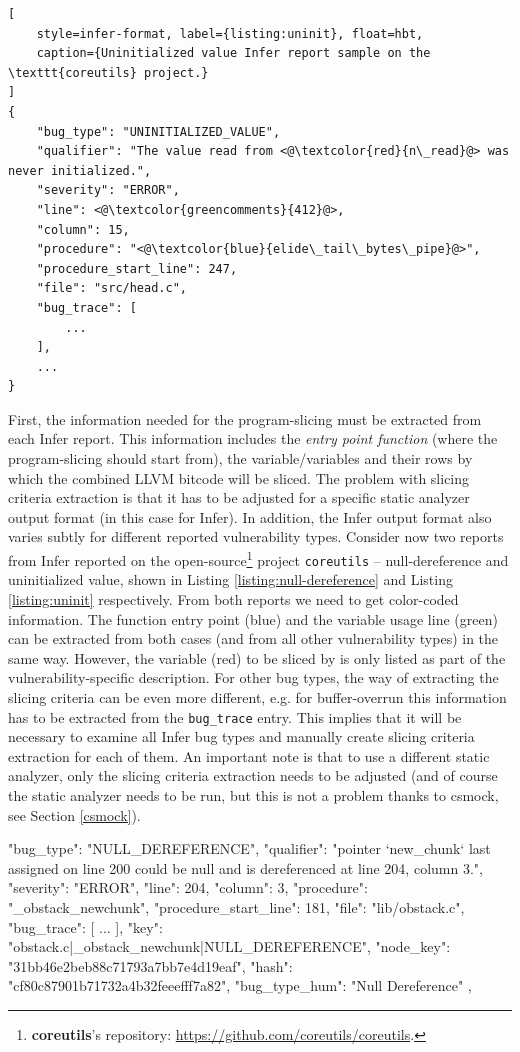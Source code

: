 \begin{lstlisting}[
    style=infer-format, label={listing:uninit}, float=hbt,
    caption={Uninitialized value Infer report sample on the \texttt{coreutils} project.}
]
{
    "bug_type": "UNINITIALIZED_VALUE",
    "qualifier": "The value read from <@\textcolor{red}{n\_read}@> was never initialized.",
    "severity": "ERROR",
    "line": <@\textcolor{greencomments}{412}@>,
    "column": 15,
    "procedure": "<@\textcolor{blue}{elide\_tail\_bytes\_pipe}@>",
    "procedure_start_line": 247,
    "file": "src/head.c",
    "bug_trace": [
        ...
    ],
    ...
}
\end{lstlisting}

First, the information needed for the program-slicing must be extracted from each Infer report. This information includes the \textit{entry point function} (where the program-slicing should start from), the variable/variables and their rows by which the combined LLVM bitcode will be sliced. The problem with slicing criteria extraction is that it has to be adjusted for a specific static analyzer output format (in this case for Infer). In addition, the Infer output format also varies subtly for different reported vulnerability types. Consider now two reports from Infer reported on the open-source\footnote{\textbf{coreutils}'s repository: \url{https://github.com/coreutils/coreutils}.} project \texttt{coreutils} -- null-dereference and uninitialized value, shown in Listing \ref{listing:null-dereference} and Listing \ref{listing:uninit} respectively. From both reports we need to get color-coded information. The function entry point (blue) and the variable usage line (green) can be extracted from both cases (and from all other vulnerability types) in the same way. However, the variable (red) to be sliced by is only listed as part of the vulnerability-specific description. For other bug types, the way of extracting the slicing criteria can be even more different, e.g. for buffer-overrun this information has to be extracted from the \texttt{bug\_trace} entry. This implies that it will be necessary to examine all Infer bug types and manually create slicing criteria extraction for each of them. An important note is that to use a different static analyzer, only the slicing criteria extraction needs to be adjusted (and of course the static analyzer needs to be run, but this is not a problem thanks to csmock, see Section \ref{csmock}).


\iffalse %
    {
        "bug_type": "NULL_DEREFERENCE",
        "qualifier": "pointer `new_chunk` last assigned on line 200 could be null and is dereferenced at line 204, column 3.",
        "severity": "ERROR",
        "line": 204,
        "column": 3,
        "procedure": "_obstack_newchunk",
        "procedure_start_line": 181,
        "file": "lib/obstack.c",
        "bug_trace": [
            ...
        ],
        "key": "obstack.c|_obstack_newchunk|NULL_DEREFERENCE",
        "node_key": "31bb46e2beb88c71793a7bb7e4d19eaf",
        "hash": "cf80c87901b71732a4b32feeefff7a82",
        "bug_type_hum": "Null Dereference"
    },

